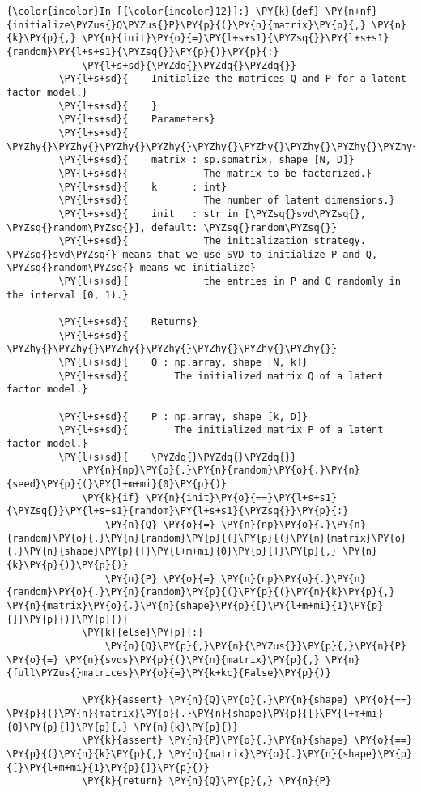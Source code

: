     \begin{Verbatim}[commandchars=\\\{\}]
{\color{incolor}In [{\color{incolor}12}]:} \PY{k}{def} \PY{n+nf}{initialize\PYZus{}Q\PYZus{}P}\PY{p}{(}\PY{n}{matrix}\PY{p}{,} \PY{n}{k}\PY{p}{,} \PY{n}{init}\PY{o}{=}\PY{l+s+s1}{\PYZsq{}}\PY{l+s+s1}{random}\PY{l+s+s1}{\PYZsq{}}\PY{p}{)}\PY{p}{:}
             \PY{l+s+sd}{\PYZdq{}\PYZdq{}\PYZdq{}}
         \PY{l+s+sd}{    Initialize the matrices Q and P for a latent factor model.}
         \PY{l+s+sd}{    }
         \PY{l+s+sd}{    Parameters}
         \PY{l+s+sd}{    \PYZhy{}\PYZhy{}\PYZhy{}\PYZhy{}\PYZhy{}\PYZhy{}\PYZhy{}\PYZhy{}\PYZhy{}\PYZhy{}}
         \PY{l+s+sd}{    matrix : sp.spmatrix, shape [N, D]}
         \PY{l+s+sd}{             The matrix to be factorized.}
         \PY{l+s+sd}{    k      : int}
         \PY{l+s+sd}{             The number of latent dimensions.}
         \PY{l+s+sd}{    init   : str in [\PYZsq{}svd\PYZsq{}, \PYZsq{}random\PYZsq{}], default: \PYZsq{}random\PYZsq{}}
         \PY{l+s+sd}{             The initialization strategy. \PYZsq{}svd\PYZsq{} means that we use SVD to initialize P and Q, \PYZsq{}random\PYZsq{} means we initialize}
         \PY{l+s+sd}{             the entries in P and Q randomly in the interval [0, 1).}
         
         \PY{l+s+sd}{    Returns}
         \PY{l+s+sd}{    \PYZhy{}\PYZhy{}\PYZhy{}\PYZhy{}\PYZhy{}\PYZhy{}\PYZhy{}}
         \PY{l+s+sd}{    Q : np.array, shape [N, k]}
         \PY{l+s+sd}{        The initialized matrix Q of a latent factor model.}
         
         \PY{l+s+sd}{    P : np.array, shape [k, D]}
         \PY{l+s+sd}{        The initialized matrix P of a latent factor model.}
         \PY{l+s+sd}{    \PYZdq{}\PYZdq{}\PYZdq{}}
             \PY{n}{np}\PY{o}{.}\PY{n}{random}\PY{o}{.}\PY{n}{seed}\PY{p}{(}\PY{l+m+mi}{0}\PY{p}{)}
             \PY{k}{if} \PY{n}{init}\PY{o}{==}\PY{l+s+s1}{\PYZsq{}}\PY{l+s+s1}{random}\PY{l+s+s1}{\PYZsq{}}\PY{p}{:}
                 \PY{n}{Q} \PY{o}{=} \PY{n}{np}\PY{o}{.}\PY{n}{random}\PY{o}{.}\PY{n}{random}\PY{p}{(}\PY{p}{(}\PY{n}{matrix}\PY{o}{.}\PY{n}{shape}\PY{p}{[}\PY{l+m+mi}{0}\PY{p}{]}\PY{p}{,} \PY{n}{k}\PY{p}{)}\PY{p}{)}
                 \PY{n}{P} \PY{o}{=} \PY{n}{np}\PY{o}{.}\PY{n}{random}\PY{o}{.}\PY{n}{random}\PY{p}{(}\PY{p}{(}\PY{n}{k}\PY{p}{,} \PY{n}{matrix}\PY{o}{.}\PY{n}{shape}\PY{p}{[}\PY{l+m+mi}{1}\PY{p}{]}\PY{p}{)}\PY{p}{)}
             \PY{k}{else}\PY{p}{:}
                 \PY{n}{Q}\PY{p}{,}\PY{n}{\PYZus{}}\PY{p}{,}\PY{n}{P} \PY{o}{=} \PY{n}{svds}\PY{p}{(}\PY{n}{matrix}\PY{p}{,} \PY{n}{full\PYZus{}matrices}\PY{o}{=}\PY{k+kc}{False}\PY{p}{)}
                 
             \PY{k}{assert} \PY{n}{Q}\PY{o}{.}\PY{n}{shape} \PY{o}{==} \PY{p}{(}\PY{n}{matrix}\PY{o}{.}\PY{n}{shape}\PY{p}{[}\PY{l+m+mi}{0}\PY{p}{]}\PY{p}{,} \PY{n}{k}\PY{p}{)}
             \PY{k}{assert} \PY{n}{P}\PY{o}{.}\PY{n}{shape} \PY{o}{==} \PY{p}{(}\PY{n}{k}\PY{p}{,} \PY{n}{matrix}\PY{o}{.}\PY{n}{shape}\PY{p}{[}\PY{l+m+mi}{1}\PY{p}{]}\PY{p}{)}
             \PY{k}{return} \PY{n}{Q}\PY{p}{,} \PY{n}{P}
\end{Verbatim}


